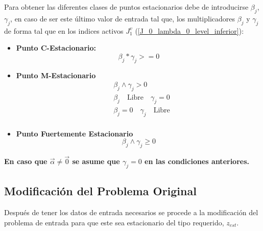 %
Para obtener las diferentes clases de puntos estacionarios debe de introducirse $\beta_j$, $\gamma_j$, en caso de ser este último valor de entrada tal que, los multiplicadores $\beta_j$  y $\gamma_j$ de forma tal que en los indices activos $J_1^v$ (\ref{J_0_lambda_0_level_inferior}): 
\begin{itemize}
    \item \textbf{Punto C-Estacionario:}\\
    \begin{equation}
        \beta_j * \gamma_j >=0
        \label{Requisitos puntos C-Estacionario}
    \end{equation}
    \item \textbf{Punto M-Estacionario}\\
    \begin{equation}
        \begin{aligned}
            &\beta_j \land \gamma_j>0\\
            &\beta_j \quad \text{Libre} \quad \gamma_j=0\\
            &\beta_j=0 \quad \gamma_j \quad \text{Libre}\\
        \end{aligned}
        \label{Requisitos puntos M-Estacionarios}
    \end{equation}
    \item \textbf{Punto Fuertemente Estacionario}\\
     \begin{equation}
        \beta_j \land \gamma_j \geq 0
    \label{Requisitos puntos Fuertemente Estacionarios}
    \end{equation}    
\end{itemize}
\textbf{En caso que $\vec{\alpha} \neq \vec{0}$ se asume que $\gamma_j=0$ en las condiciones anteriores.}


\subsection*{Modificación del Problema Original}
Después de tener los datos de entrada necesarios se procede a la modificación
del problema de entrada para que este sea estacionario del tipo requerido, $z_{est}$.

